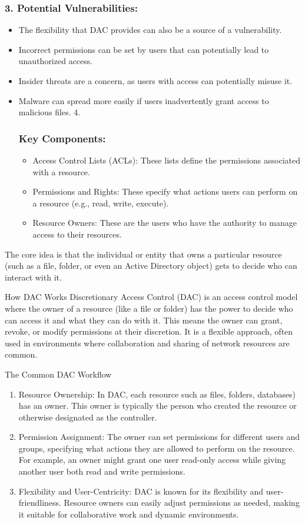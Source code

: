 \subsubsection{\textbf{3. Potential Vulnerabilities:}}
\begin{itemize}
    \item The flexibility that DAC provides can also be a source of a vulnerability.
    \item Incorrect permissions can be set by users that can potentially lead to unauthorized access.
    \item Insider threats are a concern, as users with access can potentially misuse it.
    \item Malware can spread more easily if users inadvertently grant access to malicious files.
4. \subsubsection{\textbf{Key Components:}}
\begin{itemize}
    \item Access Control Lists (ACLs): These lists define the permissions associated with a resource.
    \item Permissions and Rights: These specify what actions users can perform on a resource (e.g., read, write, execute).
    \item Resource Owners: These are the users who have the authority to manage access to their resources.
\end{itemize}
\end{itemize}

The core idea is that the individual or entity that owns a particular resource (such as a file, folder, or even an Active Directory object) gets to decide who can interact with it.

How DAC Works
Discretionary Access Control (DAC) is an access control model where the owner of a resource (like a file or folder) has the power to decide who can access it and what they can do with it. This means the owner can grant, revoke, or modify permissions at their discretion. It is a flexible approach, often used in environments where collaboration and sharing of network resources are common.

The Common DAC Workflow
\begin{enumerate}
    \item Resource Ownership: In DAC, each resource such as files, folders, databases) has an owner. This owner is typically the person who created the resource or otherwise designated as the controller.
    \item Permission Assignment: The owner can set permissions for different users and groups, specifying what actions they are allowed to perform on the resource. For example, an owner might grant one user read-only access while giving another user both read and write permissions.
    \item Flexibility and User-Centricity: DAC is known for its flexibility and user-friendliness. Resource owners can easily adjust permissions as needed, making it suitable for collaborative work and dynamic environments.
\end{enumerate}

